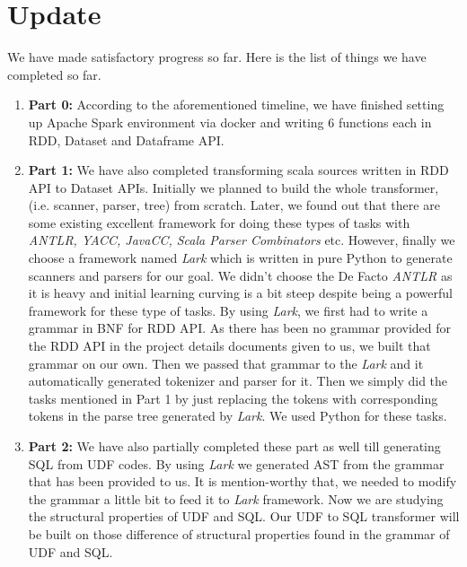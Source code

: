 \documentclass[sigplan, review]{acmart}\settopmatter{printfolios=true,printccs=false,printacmref=false}
\begin{document}
\section{Update}
We have made satisfactory progress so far. Here is the list of things we have completed so far.

\begin{enumerate}
	\item \textbf{Part 0:} According to the aforementioned timeline, we have finished setting up Apache Spark environment via docker and writing 6 functions each in RDD, Dataset and Dataframe API.
	\item \textbf{Part 1:}  We have also completed transforming scala sources written in RDD API to Dataset APIs. Initially we planned to build the whole transformer, (i.e. scanner, parser, tree) from scratch. Later, we found out that there are some existing excellent framework for doing these types of tasks with \textit{ANTLR, YACC, JavaCC, Scala Parser Combinators} etc. However, finally we choose a framework named \textit{Lark} which is written in pure Python to generate scanners and parsers for our goal. We didn't choose the De Facto \textit{ANTLR} as it is heavy and initial learning curving is a bit steep despite being a powerful framework for these type of tasks. By using \textit{Lark}, we first had to write a grammar in BNF for RDD API. As there has been no grammar provided for the RDD API in the project details documents given to us, we built that grammar on our own. Then we passed that grammar to the \textit{Lark} and it automatically generated tokenizer and parser for it. Then we simply did the tasks mentioned in Part 1 by just replacing the tokens with corresponding tokens in the parse tree generated by \textit{Lark}. We used Python for these tasks.
	\item \textbf{Part 2:} We have also partially completed these part as well till generating SQL from UDF codes. By using \textit{Lark} we generated AST from the grammar that has been provided to us. It is mention-worthy that, we needed to modify the grammar a little bit to feed it to \textit{Lark} framework. Now we are studying the structural properties of UDF and SQL. Our UDF to SQL transformer will be built on those difference of structural properties found in the grammar of UDF and SQL. 
\end{enumerate}
\end{document}
